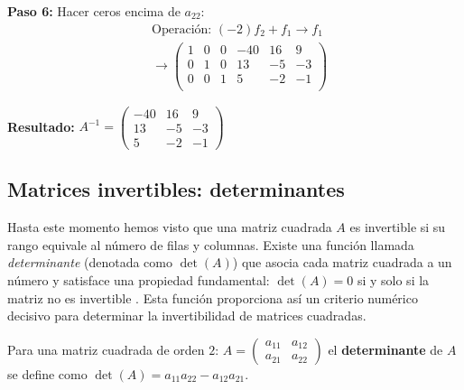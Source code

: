 \begin{myproof}
\textbf{Paso 6:} Hacer ceros encima de \(a_{22}\):
\begin{align*}
& \text{Operación: } (-2)f_2 + f_1 \to f_1 \\
& \rightarrow \left(\begin{array}{ccc|ccc}
\boxed{1} & 0 & 0 & -40 & 16 & 9 \\
0 & \boxed{1} & 0 & 13 & -5 & -3 \\
0 & 0 & \boxed{1} & 5 & -2 & -1 \\
\end{array}\right)
\end{align*}

\textbf{Resultado:} \(A^{-1} = \begin{pmatrix} -40 & 16 & 9 \\ 13 & -5 & -3 \\ 5 & -2 & -1 \end{pmatrix}\)
\end{myproof}

\subsection{Matrices invertibles: determinantes}
Hasta este momento hemos visto que una matriz cuadrada $A$ es invertible si su rango equivale al número de filas y columnas. Existe una función llamada \textit{determinante} (denotada como \(\det(A)\)) que asocia cada matriz cuadrada a un número y satisface una propiedad fundamental: \(\det(A) = 0\) si y solo si la matriz no es invertible \cite{araujo2014algebra}. Esta función proporciona así un criterio numérico decisivo para determinar la invertibilidad de matrices cuadradas.

\begin{definition}
\label{def:det2x2}
Para una matriz cuadrada de orden \(2\): \(
A = \begin{pmatrix}
a_{11} & a_{12} \\
a_{21} & a_{22}
\end{pmatrix}
\) el \textbf{determinante} de \(A\) se define como \(
\det(A) = a_{11}a_{22} - a_{12}a_{21}.
\)
\end{definition}

